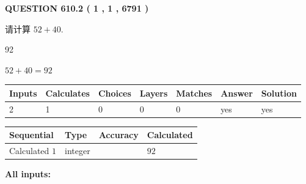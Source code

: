 \documentclass{ctexart}
\begin{document}
{\textbf{\Large{QUESTION
610.2 
 ( 1 , 1 , 6791 )
}}}
  
  
 
请计算 $ %
52 +  %
40 $.
 
 
 
\noindent{}
 
 

92
 
 
\noindent{}
 
 

 
 
 
\noindent{}
 
 

$ %
52 +  %
40=   %
92$
 
 
\noindent{}
 
 

 
   
   
   
   
\noindent\begin{tabular}{|l|l|l|l|l|l|l|}
 \hline
Inputs & Calculates & Choices & Layers & Matches & Answer & Solution \\ \hline
 2  & 
 1  & 
 0
  & 
 0  & 
 0  & 
  yes & 
  yes 
  \\ \hline
 \end{tabular}
   
   
   
   
\noindent{}
   
   
  
  
\noindent\begin{tabular}{|l|l|l|l|}
\hline
 Sequential & Type & Accuracy & Calculated \\ 
\hline
 
 
  Calculated $  1 $ & integer &  & 
  $ 92 $ 
 \\  \hline  
 \end{tabular}
   
   
   
   
\noindent\vspace{0.1in}\hspace{-0.08in} {\textbf{\Large{All inputs: }}}
   
\end{document}

